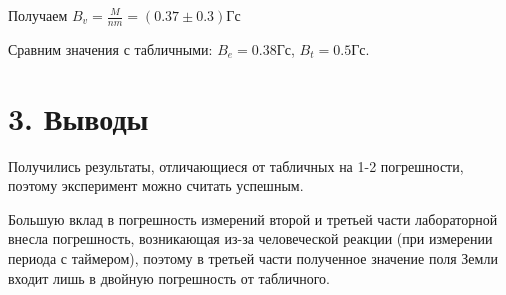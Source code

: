 \documentclass[a4paper, 12pt]{article}
\begin{document}
Получаем $B_v=\frac{M}{nm}=(0.37\pm0.3)\text{Гс}$

Сравним значения с табличными: $B_e=0.38\text{Гс}$, $B_t=0.5\text{Гс}$.

\section{3. Выводы}
Получились результаты, отличающиеся от табличных на 1-2 погрешности, поэтому
эксперимент можно считать успешным.

Большую вклад в погрешность измерений второй и третьей части лабораторной
внесла погрешность, возникающая из-за человеческой реакции (при измерении периода с таймером), 
поэтому в третьей части полученное значение поля Земли входит лишь в двойную погрешность
от табличного.
\end{document}
